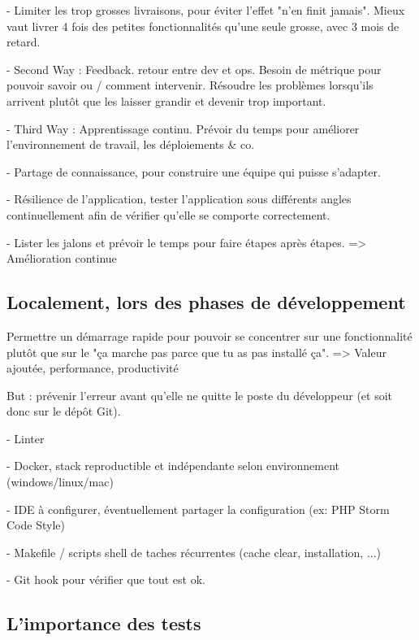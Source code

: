 - Limiter les trop grosses livraisons, pour éviter l'effet "n'en finit jamais". Mieux vaut livrer 4 fois des petites fonctionnalités qu'une seule grosse, avec 3 mois de retard.

- Second Way : Feedback. retour entre dev et ops. Besoin de métrique pour pouvoir savoir ou / comment intervenir. Résoudre les problèmes lorsqu'ils arrivent plutôt que les laisser grandir et devenir trop important.

- Third Way : Apprentissage continu. Prévoir du temps pour améliorer l'environnement de travail, les déploiements  \& co.

- Partage de connaissance, pour construire une équipe qui puisse s'adapter.

- Résilience de l'application, tester l'application sous différents angles continuellement afin de vérifier qu'elle se comporte correctement.

- Lister les jalons et prévoir le temps pour faire étapes après étapes. => Amélioration continue

\subsection{Localement, lors des phases de développement}


Permettre un démarrage rapide pour pouvoir se concentrer sur une fonctionnalité plutôt que sur le "ça marche pas parce que tu as pas installé ça". => Valeur ajoutée, performance, productivité

But : prévenir l'erreur avant qu'elle ne quitte le poste du développeur (et soit donc sur le dépôt Git).

-  Linter

-  Docker, stack reproductible et indépendante selon environnement (windows/linux/mac) 

- IDE à configurer, éventuellement partager la configuration (ex: PHP Storm Code Style)

-  Makefile / scripts shell de taches récurrentes (cache clear, installation, ...)

- Git hook pour vérifier que tout est ok.


\subsection{L'importance des tests}

